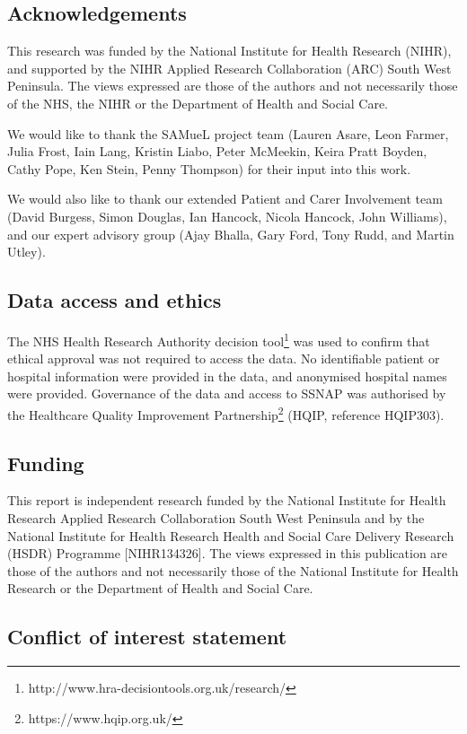\subsection*{Acknowledgements}

This research was funded by the National Institute for Health Research (NIHR), and supported by the NIHR Applied Research Collaboration (ARC) South West Peninsula. The views expressed are those of the authors and not necessarily those of the NHS, the NIHR or the Department of Health and Social Care.

We would like to thank the SAMueL project team (Lauren Asare, Leon Farmer, Julia Frost,  Iain Lang, Kristin Liabo, Peter McMeekin, Keira Pratt Boyden, Cathy Pope, Ken Stein, Penny Thompson) for their input into this work.

We would also like to thank our extended Patient and Carer Involvement team (David Burgess, Simon Douglas, Ian Hancock, Nicola Hancock, John Williams), and our expert advisory group (Ajay Bhalla, Gary Ford, Tony Rudd, and Martin Utley).

\subsection{Data access and ethics}

The NHS Health Research Authority decision tool\footnote{http://www.hra-decisiontools.org.uk/research/} was used to confirm that ethical approval was not required to access the data. No identifiable patient or hospital information were provided in the data, and anonymised hospital names were provided. Governance of the data and access to SSNAP was authorised by the Healthcare Quality Improvement Partnership\footnote{https://www.hqip.org.uk/} (HQIP, reference HQIP303). 

\subsection*{Funding}

This report is independent research funded by the National Institute for Health Research Applied Research Collaboration South West Peninsula and by the National Institute for Health Research Health and Social Care Delivery Research (HSDR) Programme [NIHR134326]. The views expressed in this publication are those of the authors and not necessarily those of the National Institute for Health Research or the Department of Health and Social Care.

\subsection*{Conflict of interest statement}

